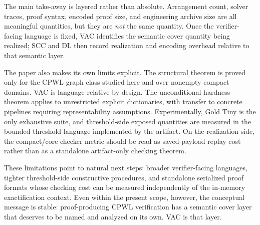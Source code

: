 \documentclass{article}
\begin{document}
The main take-away is layered rather than absolute. Arrangement count, solver traces, proof syntax, encoded proof size, and engineering archive size are all meaningful quantities, but they are \emph{not} the same quantity. Once the verifier-facing language is fixed, VAC identifies the semantic cover quantity being realized; SCC and DL then record realization and encoding overhead relative to that semantic layer.

The paper also makes its own limits explicit. The structural theorem is proved only for the CPWL graph class studied here and over nonempty compact domains. VAC is language-relative by design. The unconditional hardness theorem applies to unrestricted explicit dictionaries, with transfer to concrete pipelines requiring representability assumptions. Experimentally, Gold Tiny is the only exhaustive suite, and threshold-side exposed quantities are measured in the bounded threshold language implemented by the artifact. On the realization side, the compact/core checker metric should be read as saved-payload replay cost rather than as a standalone artifact-only checking theorem.

These limitations point to natural next steps: broader verifier-facing languages, tighter threshold-side constructive procedures, and standalone serialized proof formats whose checking cost can be measured independently of the in-memory exactification context. Even within the present scope, however, the conceptual message is stable: proof-producing CPWL verification has a semantic cover layer that deserves to be named and analyzed on its own. VAC is that layer.


\newpage



\newpage
\appendix










\newpage
\end{document}
